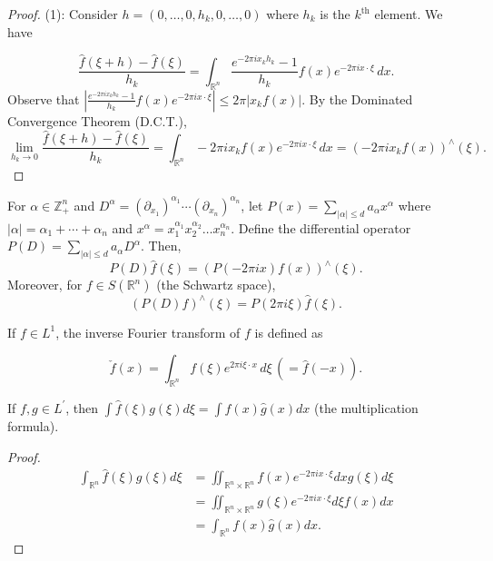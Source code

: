 \begin{proof}
    (1): Consider $h=(0, \ldots, 0, h_k, 0, \ldots, 0)$ where $h_k$ is the $k^{\text{th}}$ element. We have

$$
\frac{\hat{f}(\xi+h)-\hat{f}(\xi)}{h_k}=\int_{\mathbb{R}^n}\frac{e^{-2 \pi i x_k h_k}-1}{h_k} f(x) e^{-2 \pi i x \cdot \xi} \, dx.
$$
Observe that $\left|\frac{e^{-2 \pi i x_k h_k}-1}{h_k} f(x) e^{-2 \pi i x \cdot \xi}\right| \leqslant 2 \pi |x_k f(x)|$.
By the Dominated Convergence Theorem (D.C.T.),
$$
\lim_{{h_k \to 0}} \frac{\hat{f}(\xi+h)-\hat{f}(\xi)}{h_k}=\int_{\mathbb{R}^n} -2 \pi i x_k f(x) e^{-2 \pi i x \cdot \xi} \, dx = \left(-2 \pi i x_k f(x)\right)^{\wedge}(\xi).
$$
\end{proof}
\begin{corollary}
    For $\alpha \in \mathbb{Z}_+^n$ and $D^\alpha = \left(\partial_{x_1}\right)^{\alpha_1} \cdots \left(\partial_{x_n}\right)^{\alpha_n}$, let $P(x) = \sum_{|\alpha| \leq d} a_\alpha x^\alpha$ where $|\alpha| = \alpha_1 + \cdots + \alpha_n$ and $x^\alpha = x_1^{\alpha_1} x_2^{\alpha_2} \ldots x_n^{\alpha_n}$.
Define the differential operator $P(D) = \sum_{|\alpha| \leqslant d} a_\alpha D^\alpha$. Then,
$$
P(D) \hat{f}(\xi) = (P(-2 \pi i x) f(x))^{\wedge}(\xi).
$$
Moreover, for $f \in S(\mathbb{R}^n)$ (the Schwartz space),
$$
(P(D) f)^{\wedge}(\xi) = P(2 \pi i \xi) \hat{f}(\xi).
$$
\end{corollary}
\begin{definition}
    If $f \in L^{1}$, the inverse Fourier transform of $f$ is defined as

$$
\check{f}(x) = \int_{\mathbb{R}^n} f(\xi) e^{2 \pi i \xi \cdot x} \, d\xi \, (= \hat{f}(-x)).
$$
\end{definition}
\begin{lemma}
    If $f, g \in L^{\prime}$, then $\int \hat{f}(\xi) g(\xi) d\xi = \int f(x) \hat{g}(x) dx$ (the multiplication formula).
\end{lemma}
\begin{proof}
    $$\begin{aligned}
\int_{\mathbb{R}^n} \hat{f}(\xi) g(\xi) d\xi &= \iint_{{\mathbb{R}^n}\times{\mathbb{R}^n}} f(x) e^{-2 \pi i x \cdot \xi} dx g(\xi) d\xi \\
&= \iint_{{\mathbb{R}^n}\times{\mathbb{R}^n}} g(\xi) e^{-2 \pi i x \cdot \xi} d\xi f(x) dx \\
&= \int_{\mathbb{R}^n} f(x) \hat{g}(x) dx.
\end{aligned}
$$
\end{proof}
